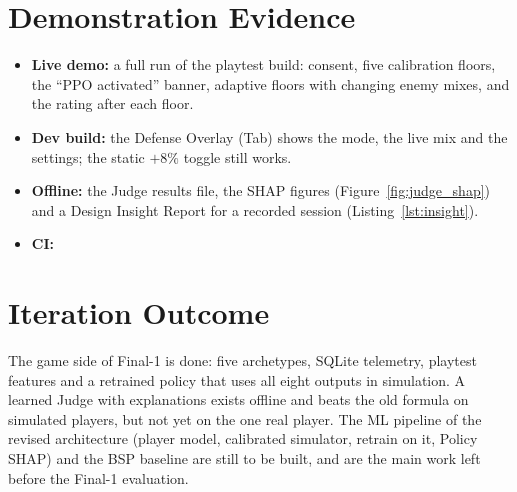 \section{Demonstration Evidence}
\begin{itemize}
    \item \textbf{Live demo:} a full run of the playtest build: consent, five calibration floors, the ``PPO activated'' banner, adaptive floors with changing enemy mixes, and the rating after each floor. 
    \item \textbf{Dev build:} the Defense Overlay (Tab) shows the mode, the live mix and the settings; the static $+8\%$ toggle still works.
    \item \textbf{Offline:} the Judge results file, the SHAP figures (Figure~\ref{fig:judge_shap}) and a Design Insight Report for a recorded session (Listing~\ref{lst:insight}).
    \item \textbf{CI:} 
\end{itemize}

\section{Iteration Outcome}
The game side of Final-1 is done: five archetypes, SQLite telemetry, playtest features and a retrained policy that uses all eight outputs in simulation. A learned Judge with explanations exists offline and beats the old formula on simulated players, but not yet on the one real player. The ML pipeline of the revised architecture (player model, calibrated simulator, retrain on it, Policy SHAP) and the BSP baseline are still to be built, and are the main work left before the Final-1 evaluation.
